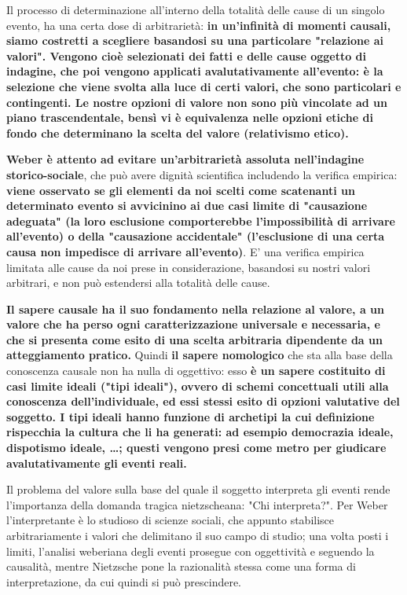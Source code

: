 Il processo di determinazione all'interno della totalità delle cause di un singolo evento, ha una certa dose di arbitrarietà: \textbf{in un'infinità di momenti causali, siamo costretti a scegliere basandosi su una particolare "relazione ai valori". Vengono cioè selezionati dei fatti e delle cause oggetto di indagine, che poi vengono applicati avalutativamente all'evento: è la selezione che viene svolta alla luce di certi valori, che sono particolari e contingenti. Le nostre opzioni di valore non sono più vincolate  ad un piano trascendentale, bensì vi è equivalenza nelle opzioni etiche di fondo che determinano la scelta del valore (relativismo etico).}

\textbf{Weber è attento ad evitare un'arbitrarietà assoluta nell'indagine storico-sociale}, che può avere dignità scientifica includendo la verifica empirica: \textbf{viene osservato se gli elementi da noi scelti come scatenanti un determinato evento si avvicinino ai due casi limite di "causazione adeguata" (la loro esclusione comporterebbe l'impossibilità di arrivare all'evento) o della "causazione accidentale" (l'esclusione di una certa causa non impedisce di arrivare all'evento)}. E' una verifica empirica limitata  alle cause da noi prese in considerazione, basandosi su nostri valori arbitrari, e non può estendersi alla totalità delle cause.

\textbf{Il sapere causale ha il suo fondamento nella relazione al valore, a un valore che ha perso ogni caratterizzazione universale e necessaria, e che si presenta come esito di una scelta arbitraria dipendente  da  un atteggiamento pratico.}
Quindi \textbf{il sapere nomologico} che sta alla base della conoscenza causale non ha nulla di oggettivo: esso \textbf{è un sapere costituito  di casi limite ideali ("tipi ideali"), ovvero di schemi concettuali utili alla conoscenza dell'individuale, ed essi stessi esito di  opzioni valutative del soggetto. I tipi ideali hanno funzione di archetipi la cui definizione rispecchia la cultura che li ha generati: ad esempio democrazia ideale, dispotismo ideale, \dots; questi vengono presi come metro per giudicare avalutativamente gli eventi reali.}
 
Il problema del valore sulla base del quale il soggetto interpreta gli eventi rende l'importanza della domanda tragica nietzscheana: "Chi interpreta?". Per Weber l'interpretante è lo studioso di scienze sociali, che appunto stabilisce arbitrariamente i valori che delimitano il suo campo di studio; una volta posti i limiti, l'analisi weberiana degli eventi prosegue con oggettività e seguendo la causalità, mentre Nietzsche pone la razionalità stessa come una forma di interpretazione, da cui quindi si può prescindere.

